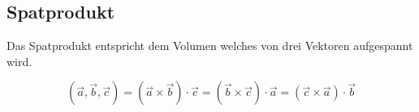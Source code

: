 \subsection{Spatprodukt}
Das Spatprodukt entspricht dem Volumen welches von drei Vektoren aufgespannt wird.

\[ \boxed{ (\vec{a},\vec{b},\vec{c}) = (\vec{a} \times \vec{b}) \cdot \vec{c} = (\vec{b} \times \vec{c}) \cdot \vec{a} = (\vec{c} \times \vec{a}) \cdot \vec{b} } \]
